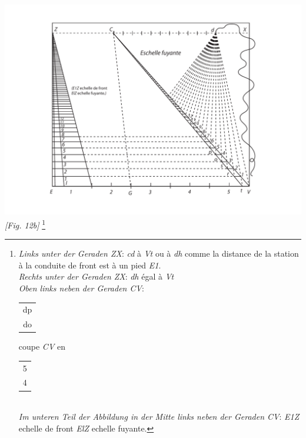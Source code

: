 \begin{center}
\includegraphics[width=1\textwidth]{images/T29-Desargues_87_b}
\\\textit{[Fig. 12b]}
\footnote{\textit{Links unter der Geraden ZX}: \textit{cd} \`{a} \textit{Vt} ou \`{a} \textit{dh} comme la distance de la station \`{a} la conduite de front est \`{a} un pied \textit{E1}. \\ \textit{Rechts unter der Geraden }\textit{ZX}: \textit{dh} \'{e}gal \`{a} \textit{Vt} \\ \textit{Oben links neben der Geraden CV}: \protect\begin{tabular}{c} dp\\do\protect\end{tabular} coupe \textit{CV} en \protect\begin{tabular}{c} 5\\4\protect\end{tabular}\rule[-4mm]{0mm}{10mm}  \\ \textit{Im unteren Teil der Abbildung in der Mitte links neben der Geraden CV}: \textit{E1Z} echelle de front\protect{} \textit{ElZ} echelle fuyante\protect{}.} 
\end{center}